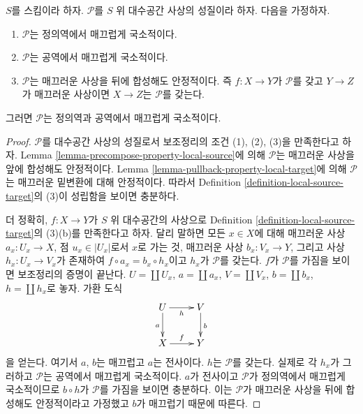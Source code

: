 \begin{lemma}
\label{lemma-smooth-local-source-target}
$S$를 스킴이라 하자. $\mathcal{P}$를 $S$ 위 대수공간 사상의 성질이라
하자. 다음을 가정하자.
\begin{enumerate}
\item $\mathcal{P}$는 정의역에서 매끄럽게 국소적이다.
\item $\mathcal{P}$는 공역에서 매끄럽게 국소적이다.
\item $\mathcal{P}$는 매끄러운 사상을 뒤에 합성해도 안정적이다. 즉
$f:X\to Y$가 $\mathcal{P}$를 갖고 $Y\to Z$가 매끄러운 사상이면
$X\to Z$는 $\mathcal{P}$를 갖는다.
\end{enumerate}
그러면 $\mathcal{P}$는 정의역과 공역에서 매끄럽게 국소적이다.
\end{lemma}

\begin{proof}
$\mathcal{P}$를 대수공간 사상의 성질로서 보조정리의 조건 (1), (2),
(3)을 만족한다고 하자. Lemma \ref{lemma-precompose-property-local-source}에
의해 $\mathcal{P}$는 매끄러운 사상을 앞에 합성해도 안정적이다. Lemma
\ref{lemma-pullback-property-local-target}에 의해 $\mathcal{P}$는 매끄러운
밑변환에 대해 안정적이다. 따라서 Definition
\ref{definition-local-source-target}의 (3)이 성립함을 보이면 충분하다.

\medskip\noindent
더 정확히, $f:X\to Y$가 $S$ 위 대수공간의 사상으로 Definition
\ref{definition-local-source-target}의 (3)(b)를 만족한다고 하자. 달리
말하면 모든
$x\in X$에 대해 매끄러운 사상 $a_x:U_x\to X$, 점 $u_x\in|U_x|$로서
$x$로 가는 것, 매끄러운 사상 $b_x:V_x\to Y$, 그리고 사상
$h_x:U_x\to V_x$가 존재하여 $f\circ a_x=b_x\circ h_x$이고 $h_x$가
$\mathcal{P}$를 갖는다. $f$가 $\mathcal{P}$를 가짐을 보이면 보조정리의
증명이 끝난다. $U=\coprod U_x$, $a=\coprod a_x$, $V=\coprod V_x$,
$b=\coprod b_x$, $h=\coprod h_x$로 놓자. 가환 도식
$$
\xymatrix{
U \ar[d]_a \ar[r]_h & V \ar[d]^b \\
X \ar[r]^f & Y
}
$$
을 얻는다. 여기서 $a$, $b$는 매끄럽고 $a$는 전사이다. $h$는
$\mathcal{P}$를 갖는다. 실제로 각 $h_x$가 그러하고 $\mathcal{P}$는
공역에서 매끄럽게 국소적이다. $a$가 전사이고 $\mathcal{P}$가 정의역에서
매끄럽게 국소적이므로 $b\circ h$가 $\mathcal{P}$를 가짐을 보이면
충분하다. 이는 $\mathcal{P}$가 매끄러운 사상을 뒤에 합성해도 안정적이라고
가정했고 $b$가 매끄럽기 때문에 따른다.
\end{proof}

